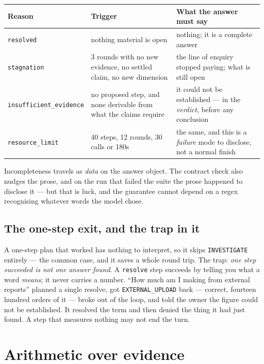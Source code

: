 \documentclass[11pt,a4paper]{report}
\newcommand{\code}[1]{\texttt{\small #1}}
\begin{document}
\begin{center}
\small
\begin{tabular}{@{}p{3.9cm}p{4.4cm}p{6.3cm}@{}}
\toprule
\textbf{Reason} & \textbf{Trigger} & \textbf{What the answer must say}\\
\midrule
\code{resolved} & nothing material is open & nothing; it is a complete answer\\
\code{stagnation} & 3 rounds with no new evidence, no settled claim, no new dimension & the line of
 enquiry stopped paying; what is still open\\
\code{insufficient\_evidence} & no proposed step, and none derivable from what the claims require &
 it could not be established --- in the \emph{verdict}, before any conclusion\\
\code{resource\_limit} & 40 steps, 12 rounds, 30 calls or 180s & the same, and this is a
 \emph{failure} mode to disclose, not a normal finish\\
\bottomrule
\end{tabular}
\end{center}

\noindent Incompleteness travels as \emph{data} on the answer object. The contract check also
nudges the prose, and on the run that failed the suite the prose happened to disclose it --- but
that is luck, and the guarantee cannot depend on a regex recognising whatever words the model chose.

\subsection{The one-step exit, and the trap in it}

A one-step plan that worked has nothing to interpret, so it skips \code{INVESTIGATE} entirely ---
the common case, and it saves a whole round trip. The trap: \emph{one step succeeded is not one
answer found}. A \code{resolve} step succeeds by telling you what a word \emph{means}; it never
carries a number. ``How much am I making from external reports'' planned a single resolve, got
\code{EXTERNAL\_UPLOAD} back --- correct, fourteen hundred orders of it --- broke out of the loop,
and told the owner the figure could not be established. It resolved the term and then denied the
thing it had just found. A step that measures nothing may not end the turn.

\section{Arithmetic over evidence}
\label{sec:calc}
\end{document}
